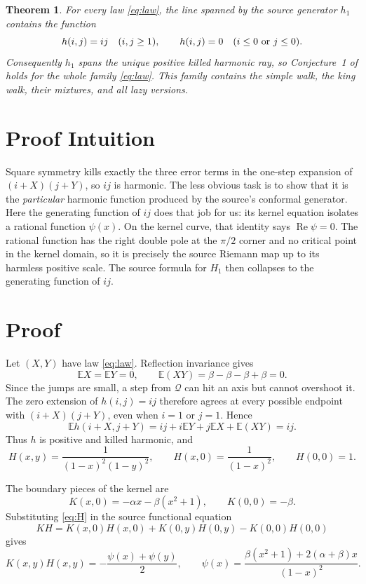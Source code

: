 \documentclass[10pt]{article}
\newtheorem{theorem}{Theorem}
\newcommand{\E}{\mathbb E}
\newcommand{\Q}{\mathcal Q}
\begin{document}
\begin{theorem}\label{thm:main}
For every law \eqref{eq:law}, the line spanned by the source generator $h_1$
contains the function
\[
 h(i,j)=ij\quad(i,j\geq1),\qquad h(i,j)=0\quad(i\leq0\ \hbox{or}\ j\leq0).
\]
Consequently $h_1$ spans the unique positive killed harmonic ray, so
Conjecture~1 of \cite{HRT} holds for the whole family \eqref{eq:law}.
This family contains the simple walk, the king walk, their mixtures, and all
lazy versions.
\end{theorem}

\section*{Proof Intuition}

Square symmetry kills exactly the three error terms in the one-step expansion
of $(i+X)(j+Y)$, so $ij$ is harmonic.  The less obvious task is to show that it
is the \emph{particular} harmonic function produced by the source's conformal
generator.  Here the generating function of $ij$ does that job for us: its
kernel equation isolates a rational function $\psi(x)$.  On the kernel curve,
that identity says $\operatorname{Re}\psi=0$.  The rational function has the
right double pole at the $\pi/2$ corner and no critical point in the kernel
domain, so it is precisely the source Riemann map up to its harmless positive
scale.  The source formula for $H_1$ then collapses to the generating function
of $ij$.

\section*{Proof}

Let $(X,Y)$ have law \eqref{eq:law}.  Reflection invariance gives
\[
 \E X=\E Y=0,
 \qquad
 \E(XY)=\beta-\beta-\beta+\beta=0.
\]
Since the jumps are small, a step from $\Q$ can hit an axis but cannot
overshoot it.  The zero extension of $h(i,j)=ij$ therefore agrees at every
possible endpoint with $(i+X)(j+Y)$, even when $i=1$ or $j=1$.  Hence
\[
 \E h(i+X,j+Y)
 =ij+i\E Y+j\E X+\E(XY)=ij.
\]
Thus $h$ is positive and killed harmonic, and
\begin{equation}\label{eq:H}
 H(x,y)=\frac1{(1-x)^2(1-y)^2},\qquad
 H(x,0)=\frac1{(1-x)^2},\qquad H(0,0)=1.
\end{equation}

The boundary pieces of the kernel are
\[
 K(x,0)=-\alpha x-\beta(x^2+1),\qquad K(0,0)=-\beta.
\]
Substituting \eqref{eq:H} in the source functional equation
\[
 KH=K(x,0)H(x,0)+K(0,y)H(0,y)-K(0,0)H(0,0)
\]
gives
\begin{equation}\label{eq:key}
 K(x,y)H(x,y)=-\frac{\psi(x)+\psi(y)}2,\qquad
 \psi(x)=\frac{\beta(x^2+1)+2(\alpha+\beta)x}{(1-x)^2}.
\end{equation}
\end{document}
